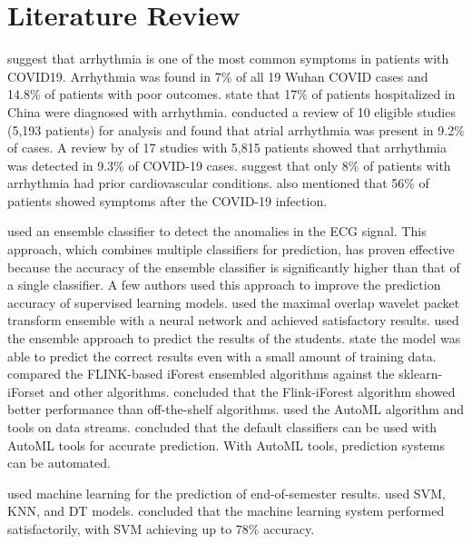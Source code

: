 \section{Literature Review} \label{sec:literature_review}

\cite*{02_rp} suggest that arrhythmia is one of the most common symptoms in patients with COVID19. Arrhythmia was found in 7\% of all 19 Wuhan COVID cases and 14.8\% of patients with poor outcomes. \cite*{18_rp} state that 17\% of patients hospitalized in China were diagnosed with arrhythmia. \citeauthor{18_rp} conducted a review of 10 eligible studies (5,193 patients) for analysis and found that atrial arrhythmia was present in 9.2\% of cases. A review by \cite*{15_rp} of 17 studies with 5,815 patients showed that arrhythmia was detected in 9.3\% of COVID-19 cases. \cite*{25_rp} suggest that only 8\% of patients with arrhythmia had prior cardiovascular conditions. {\responsemod \citeauthor{25_rp} also mentioned that 56\% of patients showed symptoms after the COVID-19 infection.}

\cite*{24_rp} used an ensemble classifier to detect the anomalies in the ECG signal. This approach, which combines multiple classifiers for prediction, has proven effective because the accuracy of the ensemble classifier is significantly higher than that of a single classifier. A few authors used this approach to improve the prediction accuracy of supervised learning models. \cite*{10_rp} used the maximal overlap wavelet packet transform ensemble with a neural network and achieved satisfactory results. \cite*{20_rp} used the ensemble approach to predict the results of the students. \citeauthor{20_rp} state the model was able to predict the correct results even with a small amount of training data. \cite*{16_rp} compared the FLINK-based iForest ensembled algorithms against the sklearn-iForset and other algorithms. \citeauthor{16_rp} concluded that the Flink-iForest algorithm showed better performance than off-the-shelf algorithms. \cite*{11_rp} used the AutoML algorithm and tools on data streams. \citeauthor{11_rp} concluded that the default classifiers can be used with AutoML tools for accurate prediction. With AutoML tools, prediction systems can be automated.

\cite*{ref_paper_m1} used machine learning for the prediction of end-of-semester results. \cite*{ref_paper_m1} used SVM, KNN, and DT models. \cite*{ref_paper_m1} concluded that the machine learning system performed satisfactorily, with SVM achieving up to 78\% accuracy.

